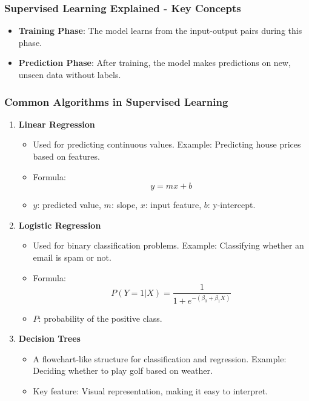 \documentclass[aspectratio=169]{beamer}
\begin{document}
\begin{frame}[fragile]
    \frametitle{Supervised Learning Explained - Key Concepts}
    \begin{itemize}
        \item \textbf{Training Phase}: The model learns from the input-output pairs during this phase.
        \item \textbf{Prediction Phase}: After training, the model makes predictions on new, unseen data without labels.
    \end{itemize}
\end{frame}

\begin{frame}[fragile]
    \frametitle{Common Algorithms in Supervised Learning}
    \begin{enumerate}
        \item \textbf{Linear Regression}
            \begin{itemize}
                \item Used for predicting continuous values. Example: Predicting house prices based on features.
                \item Formula: 
                    \begin{equation}
                    y = mx + b
                    \end{equation}
                \item $y$: predicted value, $m$: slope, $x$: input feature, $b$: y-intercept.
            \end{itemize}

        \item \textbf{Logistic Regression}
            \begin{itemize}
                \item Used for binary classification problems. Example: Classifying whether an email is spam or not.
                \item Formula:
                    \begin{equation}
                    P(Y=1|X) = \frac{1}{1 + e^{-(\beta_0 + \beta_1X)}}
                    \end{equation}
                \item $P$: probability of the positive class.
            \end{itemize}
 
        \item \textbf{Decision Trees}
            \begin{itemize}
                \item A flowchart-like structure for classification and regression. Example: Deciding whether to play golf based on weather.
                \item Key feature: Visual representation, making it easy to interpret.
            \end{itemize}
    

\end{enumerate}
\end{frame}
\end{document}
